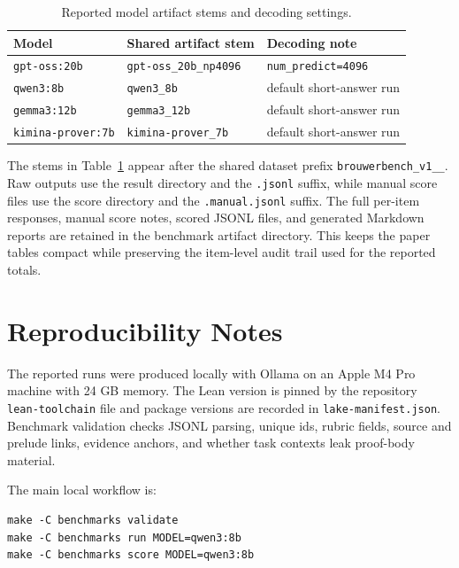 \documentclass{article}
\theoremstyle{definition}
\begin{document}
\begin{table}[H]
\caption{Reported model artifact stems and decoding settings.}
\label{tab:appendix-model-artifacts}
\begin{center}
    \begin{small}
      \begin{tabular}{lp{}p{}}
\toprule
Model & Shared artifact stem & Decoding note \\
\midrule
\texttt{gpt-oss:20b} &
\texttt{gpt-oss\_20b\_np4096} &
\texttt{num\_predict=4096} \\
\texttt{qwen3:8b} &
\texttt{qwen3\_8b} &
default short-answer run \\
\texttt{gemma3:12b} &
\texttt{gemma3\_12b} &
default short-answer run \\
\texttt{kimina-prover:7b} &
\texttt{kimina-prover\_7b} &
default short-answer run \\
\bottomrule
\end{tabular}
    \end{small}
  \end{center}
  \vskip -0.1in
\end{table}

The stems in Table~\ref{tab:appendix-model-artifacts} appear after the shared dataset prefix \texttt{brouwerbench\_v1\_\_}. Raw outputs use the result directory and the \texttt{.jsonl} suffix, while manual score files use the score directory and the \texttt{.manual.jsonl} suffix. The full per-item responses, manual score notes, scored JSONL files, and generated Markdown reports are retained in the benchmark artifact directory. This keeps the paper tables compact while preserving the item-level audit trail used for the reported totals.

\section{Reproducibility Notes}
\label{app:reproducibility}

The reported runs were produced locally with Ollama on an Apple M4 Pro machine with 24 GB memory. The Lean version is pinned by the repository \texttt{lean-toolchain} file and package versions are recorded in \texttt{lake-manifest.json}. Benchmark validation checks JSONL parsing, unique ids, rubric fields, source and prelude links, evidence anchors, and whether task contexts leak proof-body material.

The main local workflow is:
\begin{verbatim}
make -C benchmarks validate
make -C benchmarks run MODEL=qwen3:8b
make -C benchmarks score MODEL=qwen3:8b
\end{verbatim}
\end{document}
